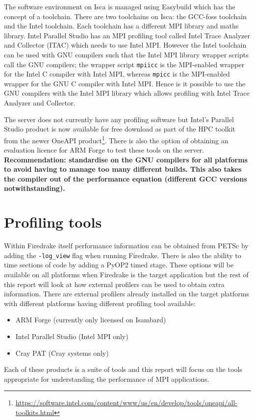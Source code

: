 \documentclass[a4paper,titlepage]{article}
\begin{document}
The software environment on Isca is managed using Easybuild which has the concept of a toolchain. There are two toolchains on Isca: the GCC-foss toolchain and the Intel toolchain. Each toolchain has a different MPI library and maths library. Intel Parallel Studio has an MPI profiling tool called Intel Trace Analyzer and Collector (ITAC) which needs to use Intel MPI. However the Intel toolchain can be used with GNU compilers such that the Intel MPI library wrapper scripts call the GNU compilers; the wrapper script \texttt{mpiicc} is the MPI-enabled wrapper for the Intel C compiler with Intel MPI, whereas \texttt{mpicc} is the MPI-enabled wrapper for the GNU C compiler with Intel MPI. Hence is it possible to use the GNU compilers with the Intel MPI library which allows profiling with Intel Trace Analyzer and Collector. 

The server does not currently have any profiling software but Intel's Parallel Studio product is now available for free download as part of the HPC toolkit from the newer OneAPI product\footnote{\url{https://software.intel.com/content/www/us/en/develop/tools/oneapi/all-toolkits.html}}. There is also the option of obtaining an evaluation licence for ARM Forge to test these tools on the server. \\

\noindent
\textbf{Recommendation: standardise on the GNU compilers for all platforms to avoid having to manage too many different builds. This also takes the compiler out of the performance equation (different GCC versions notwithstanding).}


\section{Profiling tools}

Within Firedrake itself performance information can be obtained from PETSc by adding the \verb+-log_view+ flag when running Firedrake. There is also the ability to time sections of code by adding a PyOP2 timed stage. These options will be available on all platforms when Firedrake is the target application but the rest of this report will look at how external profilers can be used to obtain extra information. There are external profilers already installed on the target platforms with different platforms having different profiling tool available:
%
\begin{itemize}
\item ARM Forge (currently only licensed on Isambard)
\item Intel Parallel Studio (Intel MPI only)
\item Cray PAT (Cray systems only)
\end{itemize}
%
Each of these products is a suite of tools and this report will focus on the tools appropriate for understanding the performance of MPI applications.
\end{document}
